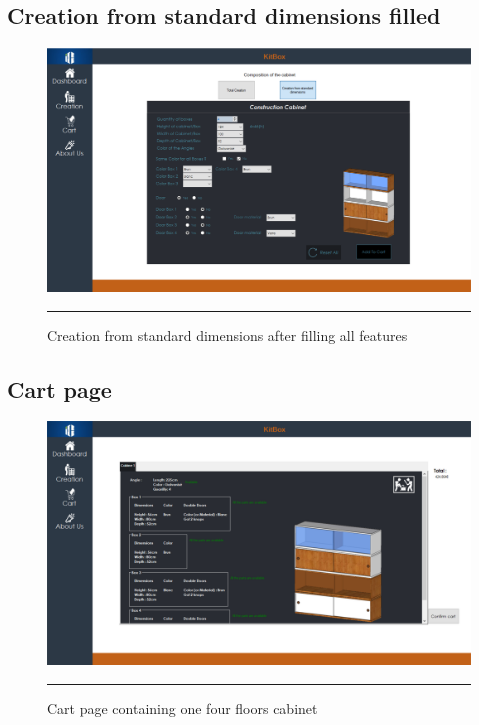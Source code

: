 	\newpage
	\subsection{Creation from standard dimensions filled}
    	\vfill
        \begin{figure}[h!]
            \centering
    		\includegraphics[height=110truemm,angle = 90]{Figures/CreationStandardFilled.PNG}
    		\rule{35em}{0.5pt}
    		\caption{Creation from standard dimensions after filling all features}
    		\label{standardtabfilled}
    	\end{figure}
    	\vfill
	
	\newpage
	\subsection{Cart page}
    	\vfill
        \begin{figure}[h!]
            \centering
    		\includegraphics[width =1.2\textwidth,angle = 90]{Figures/CartPage.PNG}
    		\rule{35em}{0.5pt}
    		\caption{Cart page containing one four floors cabinet}
    		\label{carttab}
    	\end{figure}
    	\vfill
    	
